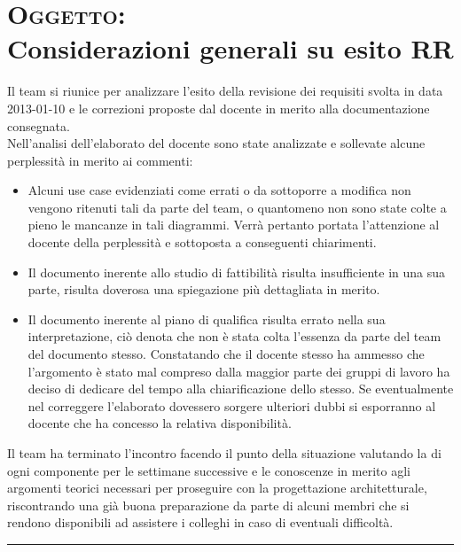 \documentclass[a4paper,10pt,openright]{article}
\begin{document}
\section*{{\textsc{Oggetto:} \\Considerazioni generali su esito RR}}
Il team si riunice per analizzare l'esito della revisione dei requisiti svolta in data 2013-01-10 e le correzioni proposte dal docente in merito alla documentazione consegnata.\\
Nell'analisi dell'elaborato del docente sono state analizzate e sollevate alcune perplessità in merito ai commenti:
\begin{itemize}
\item Alcuni use case evidenziati come errati o da sottoporre a modifica non vengono ritenuti tali da parte del team, o quantomeno non sono state colte a pieno le mancanze in tali diagrammi. Verrà pertanto portata l'attenzione al docente della perplessità e sottoposta a conseguenti chiarimenti.
\item Il documento inerente allo studio di fattibilità risulta insufficiente in una sua parte, risulta doverosa una spiegazione più dettagliata in merito.
\item Il documento inerente al piano di qualifica risulta errato nella sua interpretazione, ciò denota che non è stata colta l'essenza da parte del team del documento stesso. Constatando che il docente stesso ha ammesso che l'argomento è stato mal compreso dalla maggior parte dei gruppi di lavoro ha deciso di dedicare del tempo alla chiarificazione dello stesso. Se eventualmente nel correggere l'elaborato dovessero sorgere ulteriori dubbi si esporranno al docente che ha concesso la relativa disponibilità.
\end{itemize}
Il team ha terminato l'incontro facendo il punto della situazione valutando la di ogni componente per le settimane successive e le conoscenze in merito agli argomenti teorici necessari per proseguire con la progettazione architetturale, riscontrando una già buona preparazione da parte di alcuni membri che si rendono disponibili ad assistere i colleghi in caso di eventuali difficoltà.
\noindent\rule{\textwidth}{0.4pt}
\end{document}
